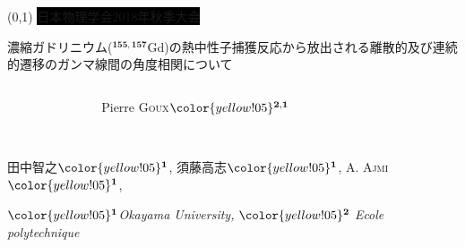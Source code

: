 

\begin{frame}[plain]{}
\centering
\vspace{\baselineskip}
\begin{center}
\boxput*(0,1){
    \colorbox{black}{\textcolor{yellow!05}{日本物理学会2018年秋季大会
}}
}{    
\setlength{\fboxsep}{5pt}
}\\
\vspace{.7\baselineskip}
\begin{minipage}{.8\linewidth}\centering\large \color{yellow!05} 濃縮ガドリニウム($^{\mathbf{155,157}}$Gd)の熱中性子捕獲反応から放出される離散的及び連続的遷移のガンマ線間の角度相関について\\\end{minipage}
\end{center}
\vspace{\baselineskip}
\begin{columns}
\begin{column}[T]{.3\linewidth}
\centering
\end{column}
\begin{column}[T]{.4\linewidth}\vspace{-\baselineskip}
\begin{center}\large{Pierre \textsc{Goux}}$\color{yellow!05}\mathbf{^{2,1}}$\\ \vspace{.5em}{平成30年9月14日} \\
\end{center}
\end{column}        
\begin{column}[T]{.3\linewidth}
\end{column}
\end{columns}\vspace{\baselineskip}
\begin{minipage}{.85\linewidth}
田中智之$\color{yellow!05}\mathbf{^1}$, 須藤高志$\color{yellow!05}\mathbf{^1}$, A. \textsc{Ajmi}$\color{yellow!05}\mathbf{^1}$, 
\end{minipage}
\vspace{.6em}

\footnotesize{\textit{$\color{yellow!05}\mathbf{^1}$Okayama University, $\color{yellow!05}\mathbf{^2}$ Ecole polytechnique} 
}
\vspace{\baselineskip}
\end{frame}

